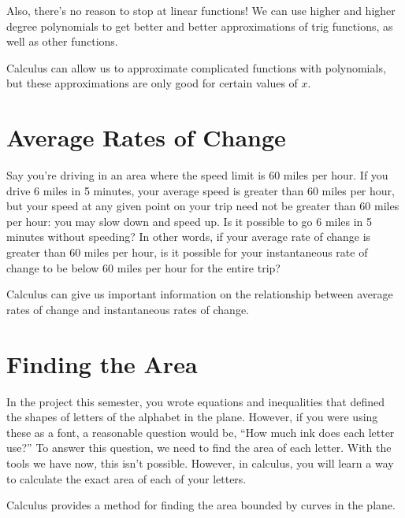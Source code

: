\documentclass{ximera}
\begin{document}
Also, there's no reason to stop at linear functions! We can use higher and higher degree polynomials to get better and better approximations of trig functions, as well as other functions. 

Calculus can allow us to approximate complicated functions with polynomials, but these approximations are only good for certain values of $x$. 

\section{Average Rates of Change}
Say you're driving in an area where the speed limit is 60 miles per hour. If you drive 6 miles in 5 minutes, your average speed is greater than 60 miles per hour, but your speed at any given point on your trip need not be greater than 60 miles per hour: you may slow down and speed up. Is it possible to go 6 miles in 5 minutes without speeding? In other words, if your average rate of change is greater than 60 miles per hour, is it possible for your instantaneous rate of change to be below 60 miles per hour for the entire trip?

Calculus can give us important information on the relationship between average rates of change and instantaneous rates of change. 

\section{Finding the Area}
In the project this semester, you wrote equations and inequalities that defined the shapes of letters of the alphabet in the plane. However, if you were using these as a font, a reasonable question would be, ``How much ink does each letter use?'' To answer this question, we need to find the area of each letter. With the tools we have now, this isn't possible. However, in calculus, you will learn a way to calculate the exact area of each of your letters.

Calculus provides a method for finding the area bounded by curves in the plane.
\end{document}
